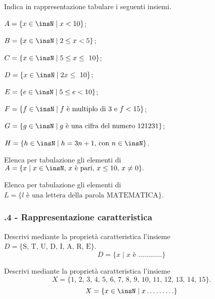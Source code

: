 \begin{esercizio}
 \label{ese:\thechapter.16}
Indica in rappresentazione tabulare i seguenti insiemi.
\TabPositions{7.5cm}
\begin{enumeratea}
 \item $A=\{x\in\insN\mid x<10\}$; %
 \item $B=\{x\in\insN\mid 2\le x<5\}$; %
 \item $C=\{x\in\insN\mid 5\le x\le~10\}$; %
 \item $D=\{x\in\insN\mid 2x\le~10\}$; %
 \item $E=\{e\in\insN\mid 5\le e<10\}$; %
 \item $F=\{f\in\insN\mid f\text{ è multiplo di~3 e } f<15\}$; %
 \item $G=\{g\in\insN\mid g\text{ è una cifra del numero }121231\}$; %
 \item $H=\{h\in\insN\mid h=3n+1\text{, con }n\in\insN\}$. %
\end{enumeratea}
\end{esercizio}

\begin{esercizio}
\label{ese:\thechapter.17}
Elenca per tabulazione gli elementi di~$A=\{x\mid x\in\insN\text{, }x\text{ è pari, }x\leq10\text{, }x\neq0\}.$
\end{esercizio}

\begin{esercizio}
\label{ese:\thechapter.18}
Elenca per tabulazione gli elementi di~$L=\{l\text{ è una lettera della parola MATEMATICA}\}$.
\end{esercizio}

\subsubsection*{\thechapter.4 - Rappresentazione caratteristica}

\begin{esercizio}
\label{ese:\thechapter.19}
Descrivi mediante la proprietà caratteristica
l'insieme~$D= \{\text{S, T, U, D, I, A, R, E}\}$.
\[D=\{x\mid x\text{ è }\ldots\ldots\ldots\ldots\}\]
\end{esercizio}


\begin{esercizio}
\label{ese:\thechapter.20}
Descrivi mediante la proprietà caratteristica l'insieme
\[X=\{\text{1, 2, 3, 4, 5, 6, 7, 8, 9, 10, 11, 12, 13, 14, 15}\}.\]
\[X=\{x\in\insN\mid x\ldots\ldots\ldots\}\]
\end{esercizio}

